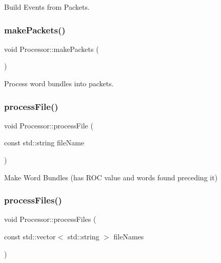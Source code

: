 Build Events from Packets. 

\mbox{\label{class_processor_a395245680ed38f6c7bf568f5af262860}} 
\subsubsection{\texorpdfstring{make\+Packets()}{makePackets()}}
{\footnotesize\ttfamily void Processor\+::make\+Packets (\begin{DoxyParamCaption}{ }\end{DoxyParamCaption})\hspace{0.3cm}{\ttfamily [private]}}



Process word bundles into packets. 

\mbox{\label{class_processor_a8dc09976d642ca778f5aa606b526a510}} 
\subsubsection{\texorpdfstring{process\+File()}{processFile()}}
{\footnotesize\ttfamily void Processor\+::process\+File (\begin{DoxyParamCaption}\item[{const std\+::string}]{file\+Name }\end{DoxyParamCaption})\hspace{0.3cm}{\ttfamily [private]}}



Make Word Bundles (has R\+OC value and words found preceding it) 

\mbox{\label{class_processor_a4186d391ddee1f68d763931dad346c4a}} 
\subsubsection{\texorpdfstring{process\+Files()}{processFiles()}}
{\footnotesize\ttfamily void Processor\+::process\+Files (\begin{DoxyParamCaption}\item[{const std\+::vector$<$ std\+::string $>$}]{file\+Names }\end{DoxyParamCaption})}

